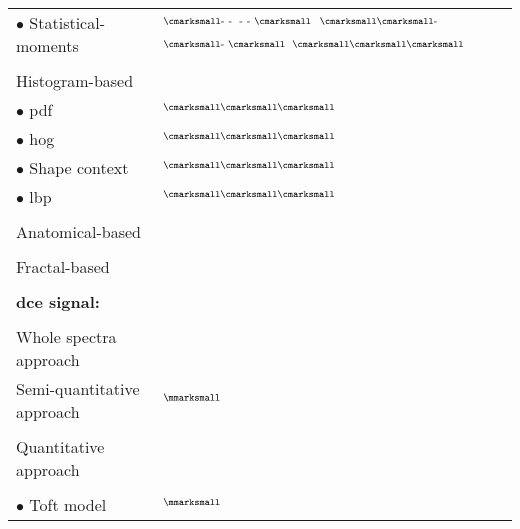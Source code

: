 \begin{longtable}{@{}l >{\raggedleft\arraybackslash}X@{}}
  \quad \quad \quad $\bullet$ Statistical-moments & $^{\text{{\cmarksmall}- -}}$\cite{Ampeliotis2007,Ampeliotis2008,Tiwari2009a,Tiwari2010,Tiwari2013,Viswanath2008,Viswanath2009,Viswanath2012,rampun2016quantitative,rampun2015computer,rampun2016computer} $^{\text{- - {\cmarksmall}}}$\cite{Antic2013} $^{\text{{\cmarksmall}{\cmarksmall}-}}$\cite{Viswanath2011} $^{\text{{\cmarksmall}- {\cmarksmall}}}$\cite{Peng2013,cameron2014multiparametric,cameron2016maps,khalvati2015automated,chung2015prostate} $^{\text{{\cmarksmall}{\cmarksmall}{\cmarksmall}}}$\cite{Litjens2011,Litjens2012,Litjens2014,Niaf2011,Niaf2012,lehaire2014computer} \\ \\ [-1.5ex]
  \quad \quad Histogram-based & \\
  \quad \quad \quad $\bullet$ \acs{pdf} & $^{\text{{\cmarksmall}{\cmarksmall}{\cmarksmall}}}$\cite{Liu2013} \\
  \quad \quad \quad $\bullet$ \acs{hog} & $^{\text{{\cmarksmall}{\cmarksmall}{\cmarksmall}}}$\cite{Liu2013} \\
  \quad \quad \quad $\bullet$ Shape context & $^{\text{{\cmarksmall}{\cmarksmall}{\cmarksmall}}}$\cite{Liu2013} \\
  \quad \quad \quad $\bullet$ \acs{lbp} & $^{\text{{\cmarksmall}{\cmarksmall}{\cmarksmall}}}$\cite{Liu2013} \\ \\ [-1.5ex]
  \quad \quad Anatomical-based & \cite{Litjens2012,Litjens2014,Matulewicz2013,cameron2014multiparametric,cameron2016maps} \\ \\ [-1.5ex]
  \quad \quad Fractal-based & \cite{Lopes2011,Lv2009} \\ \\ [-1.5ex]
  \textbf{\acs*{dce} signal:} & \\ \\ [-1.5ex]
  \quad Whole spectra approach & \cite{Ampeliotis2007,Ampeliotis2008} \\
  \quad Semi-quantitative approach & $^{\text{{\mmarksmall}}}$\cite{Puech2009} \cite{Mazzetti2011,Niaf2011,Niaf2012,Sung2011,trigui2016classification,trigui2017automatic,lehaire2014computer,samarasinghe2016semi} \\ \\ [-1.5ex]
  \quad Quantitative approach &  \\ \\ [-1.5ex]
  \quad \quad $\bullet$ Toft model & $^{\text{{\mmarksmall}}}$\cite{Liu2013,Peng2013} \cite{Giannini2013,Langer2009,Litjens2011,Litjens2012,Litjens2014,Mazzetti2011,Niaf2011,Niaf2012,lehaire2014computer,giannini2015fully} \\

\end{longtable}
